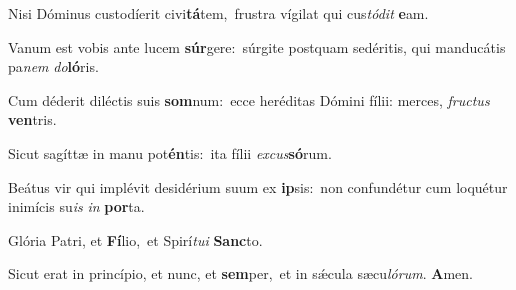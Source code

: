 ﻿\setcounter{versecount}{2}

\vs Nisi Dóminus custodíerit ci\-vi\-\textbf{tá}\-tem,~\redgreheightstar frustra vígilat qui cus\textit{tó}\textit{dit} \textbf{e}am.

\vs Vanum est vobis ante lucem \textbf{súr}\-ge\-re:~\redgreheightstar súrgite postquam sedéritis, qui manducátis pa\textit{nem} \textit{do}\textbf{ló}ris.

\vs Cum déderit diléctis suis \textbf{som}\-num:~\redgreheightstar ecce heréditas Dómini fílii: merces, \textit{fruc}\textit{tus} \textbf{ven}tris.

\vs Sicut sagíttæ in manu pot\textbf{én}tis:~\redgreheightstar ita fílii \textit{ex}\textit{cus}\textbf{só}rum.

\vs Beátus vir qui implévit desidérium suum ex \textbf{ip}sis:~\redgreheightstar non confundétur cum loquétur inimícis su\textit{is} \textit{in} \textbf{por}ta.

\vs Glória Patri, et \textbf{Fí}lio,~\redgreheightstar et Spirí\textit{tu}\textit{i} \textbf{Sanc}to.

\vs Sicut erat in princípio, et nunc, et \textbf{sem}per,~\redgreheightstar et in sǽcula sæcu\textit{ló}\textit{rum}. \textbf{A}men.


